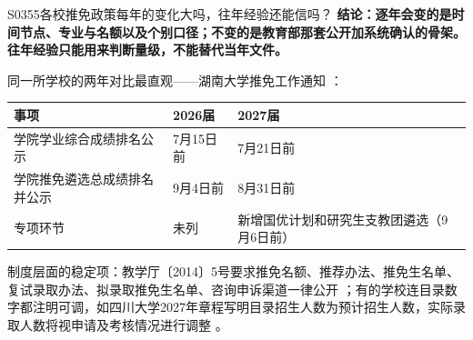 \begin{qa}{S0355}{各校推免政策每年的变化大吗，往年经验还能信吗？}
\textbf{结论：逐年会变的是时间节点、专业与名额以及个别口径；不变的是教育部那套公开加系统确认的骨架。往年经验只能用来判断量级，不能替代当年文件。}

同一所学校的两年对比最直观——湖南大学推免工作通知 ：

\par\vspace{2pt}\nobreak\begin{center}\footnotesize
\begin{tabularx}{\textwidth}{>{\raggedright\arraybackslash}X>{\raggedright\arraybackslash}X>{\raggedright\arraybackslash}X}
\toprule
\textbf{事项} & \textbf{2026届} & \textbf{2027届} \\ \midrule
学院学业综合成绩排名公示 & 7月15日前 & 7月21日前 \\
学院推免遴选总成绩排名并公示 & 9月4日前 & 8月31日前 \\
专项环节 & 未列 & 新增国优计划和研究生支教团遴选（9月6日前） \\
\bottomrule
\end{tabularx}
\end{center}\vspace{2pt}\par

制度层面的稳定项：教学厅〔2014〕5号要求推免名额、推荐办法、推免生名单、复试录取办法、拟录取推免生名单、咨询申诉渠道一律公开 ；有的学校连目录数字都注明可调，如四川大学2027年章程写明目录招生人数为预计招生人数，实际录取人数将视申请及考核情况进行调整 。
\end{qa}

